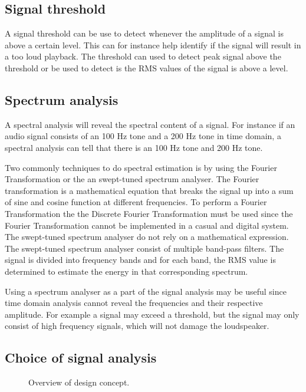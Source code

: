 \subsection*{Signal threshold}
A signal threshold can be use to detect whenever the amplitude of a signal is above a certain level. This can for instance help identify if the signal will result in a too loud playback. The threshold can used to detect peak signal above the threshold or be used to detect is the RMS values of the signal is above a level.


\subsection*{Spectrum analysis}
A spectral analysis will reveal the spectral content of a signal. For instance if an audio signal consists of an 100 Hz tone and a 200 Hz tone in time domain, a spectral analysis can tell that there is an 100 Hz tone and 200 Hz tone. 

Two commonly techniques to do spectral estimation is by using the Fourier Transformation or the an swept-tuned spectrum analyser. The Fourier transformation is a mathematical equation that breaks the signal up into a sum of sine and cosine function at different frequencies. To perform a Fourier Transformation the the Discrete Fourier Transformation must be used since the Fourier Transformation cannot be implemented in a casual and digital system. The swept-tuned spectrum analyser do not rely on a mathematical expression. The swept-tuned spectrum analyser consist of multiple band-pass filters. The signal is divided into frequency bands and for each band, the RMS value is determined to estimate the energy in that corresponding spectrum. 

Using a spectrum analyser as a part of the signal analysis may be useful since time domain analysis cannot reveal the frequencies and their respective amplitude. For example a signal may exceed a threshold, but the signal may only consist of high frequency signals, which will not damage the loudspeaker. 


\subsection{Choice of signal analysis}


\begin{figure}[H]
\centering
{}
\scalebox{0.8}{
}
\caption{Overview of design concept.}
\label{fig:signal_analysis_fig}
\end{figure}



























